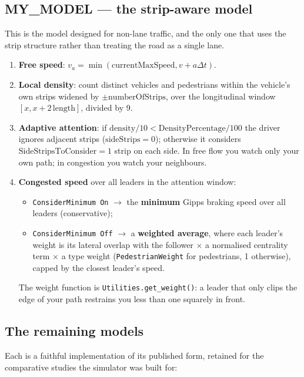 \documentclass[11pt, a4paper]{article}
\newcommand{\code}[1]{\texttt{#1}}
\begin{document}
\subsection{MY\_MODEL --- the strip-aware model}

This is the model designed for non-lane traffic, and the only one that uses the
strip structure rather than treating the road as a single lane.

\begin{enumerate}
    \item \textbf{Free speed}: $v_a = \min(\text{currentMaxSpeed}, v + a\Delta t)$.
    \item \textbf{Local density}: count distinct vehicles and pedestrians within
          the vehicle's own strips widened by $\pm\text{numberOfStrips}$, over
          the longitudinal window $[x, x + 2\,\text{length}]$, divided by 9.
    \item \textbf{Adaptive attention}: if
          $\text{density}/10 < \text{DensityPercentage}/100$ the driver ignores
          adjacent strips ($\text{sideStrips}=0$); otherwise it considers
          $\text{SideStripsToConsider}=1$ strip on each side. In free flow you
          watch only your own path; in congestion you watch your neighbours.
    \item \textbf{Congested speed} over all leaders in the attention window:
    \begin{itemize}
        \item \code{ConsiderMinimum On} $\rightarrow$ the \textbf{minimum} Gipps
              braking speed over all leaders (conservative);
        \item \code{ConsiderMinimum Off} $\rightarrow$ a \textbf{weighted
              average}, where each leader's weight is its lateral overlap with
              the follower $\times$ a normalised centrality term $\times$ a type
              weight (\code{PedestrianWeight} for pedestrians, 1 otherwise),
              capped by the closest leader's speed.
    \end{itemize}
    The weight function is \code{Utilities.get\_weight()}: a leader that only
    clips the edge of your path restrains you less than one squarely in front.
\end{enumerate}

\subsection{The remaining models}

Each is a faithful implementation of its published form, retained for the
comparative studies the simulator was built for:
\end{document}

